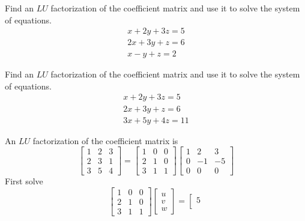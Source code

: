 \documentclass{ximera}
\begin{document}
\begin{problem}\label{prb:4.72} Find an $LU$ factorization of the coefficient matrix and use it to solve the system of equations.
\begin{equation*}
\begin{array}{c}
x+2y+3z=5 \\
2x+3y+z=6 \\
x-y+z=2
\end{array}
\end{equation*}
\end{problem}

\begin{problem}\label{prb:4.73} Find an $LU$ factorization of the coefficient matrix and use it to solve the system of equations.
\begin{equation*}
\begin{array}{c}
x+2y+3z=5 \\
2x+3y+z=6 \\
3x+5y+4z=11
\end{array}
\end{equation*}
\begin{hint}
An $LU$ factorization of the coefficient matrix is
\[
\left[
\begin{array}{rrr}
1 & 2 & 3 \\
2 & 3 & 1 \\
3 & 5 & 4
\end{array}
\right] = \left[
\begin{array}{rrr}
1 & 0 & 0 \\
2 & 1 & 0 \\
3 & 1 & 1
\end{array}
\right] \left[
\begin{array}{rrr}
1 & 2 & 3 \\
0 & -1 & -5 \\
0 & 0 & 0
\end{array}
\right]
\]
First solve
\[
 \left[
\begin{array}{rrr}
1 & 0 & 0 \\
2 & 1 & 0 \\
3 & 1 & 1
\end{array}
\right] \left[
\begin{array}{c}
u \\
v \\
w
\end{array}
\right] =\left[
\begin{array}{c}
5 \\

\end{array}\]
\end{hint}
\end{problem}
\end{document}
